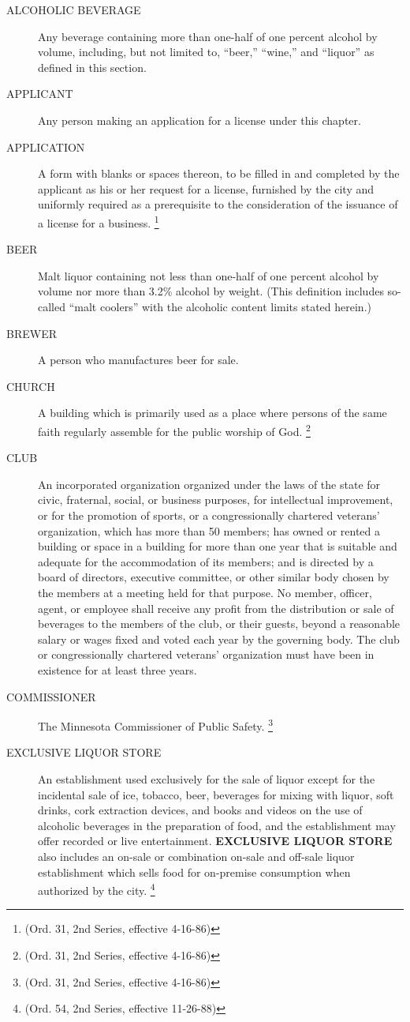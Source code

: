 \begin{description}
    \item[ALCOHOLIC BEVERAGE] Any beverage containing more than one-half of one percent alcohol by volume, including, but not limited to, “beer,” “wine,” and “liquor” as defined in this section.
    \item[APPLICANT] Any person making an application for a license under this chapter.
    \item[APPLICATION] A form with blanks or spaces thereon, to be filled in and completed by the applicant as his or her request for a license, furnished by the city and uniformly required as a prerequisite to the consideration of the issuance of a license for a business. \footnote{(Ord. 31, 2nd Series, effective 4-16-86)}
    \item[BEER] Malt liquor containing not less than one-half of one percent alcohol by volume nor more than 3.2\% alcohol by weight. (This definition includes so-called “malt coolers” with the alcoholic content limits stated herein.)
    \item[BREWER] A person who manufactures beer for sale.
    \item[CHURCH] A building which is primarily used as a place where persons of the same faith regularly assemble for the public worship of God. \footnote{(Ord. 31, 2nd Series, effective 4-16-86)}
    \item[CLUB] An incorporated organization organized under the laws of the state for civic, fraternal, social, or business purposes, for intellectual improvement, or for the promotion of sports, or a congressionally chartered veterans’ organization, which has more than 50 members; has owned or rented a building or space in a building for more than one year that is suitable and adequate for the accommodation of its members; and is directed by a board of directors, executive committee, or other similar body chosen by the members at a meeting held for that purpose.  No member, officer, agent, or employee shall receive any profit from the distribution or sale of beverages to the members of the club, or their guests, beyond a reasonable salary or wages fixed and voted each year by the governing body.  The club or congressionally chartered veterans’ organization must have been in existence for at least three years.
    \item[COMMISSIONER] The Minnesota Commissioner of Public Safety. \footnote{(Ord. 31, 2nd Series, effective 4-16-86)}
    \item[EXCLUSIVE LIQUOR STORE] An establishment used exclusively for the sale of liquor except for the incidental sale of ice, tobacco, beer, beverages for mixing with liquor, soft drinks, cork extraction devices, and books and videos on the use of alcoholic beverages in the preparation of food, and the establishment may offer recorded or live entertainment.  \textbf{EXCLUSIVE LIQUOR STORE} also includes an on-sale or combination on-sale and off-sale liquor establishment which sells food for on-premise consumption when authorized by the city. \footnote{(Ord. 54, 2nd Series, effective 11-26-88)}

\end{description}
